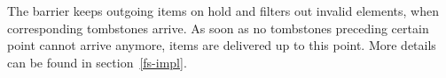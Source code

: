 
The barrier  keeps outgoing items on hold and filters out invalid elements, when corresponding tombstones arrive. 
As soon as no tombstones preceding certain point cannot arrive anymore, items are delivered  up to this point. 
%
More details can be found  in section~\ref{fs-impl}.



